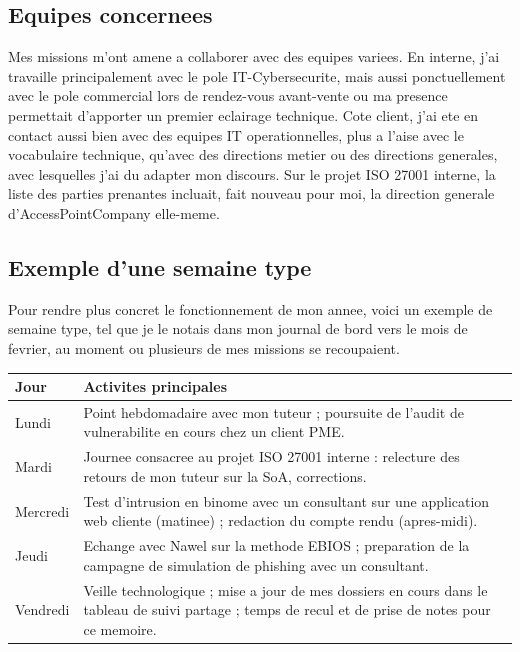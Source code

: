\documentclass[11pt,a4paper]{article}
\begin{document}
\subsection{Equipes concernees}

Mes missions m'ont amene a collaborer avec des equipes variees. En interne, j'ai travaille principalement avec le pole IT-Cybersecurite, mais aussi ponctuellement avec le pole commercial lors de rendez-vous avant-vente ou ma presence permettait d'apporter un premier eclairage technique. Cote client, j'ai ete en contact aussi bien avec des equipes IT operationnelles, plus a l'aise avec le vocabulaire technique, qu'avec des directions metier ou des directions generales, avec lesquelles j'ai du adapter mon discours. Sur le projet ISO 27001 interne, la liste des parties prenantes incluait, fait nouveau pour moi, la direction generale d'AccessPointCompany elle-meme.

\subsection{Exemple d'une semaine type}

Pour rendre plus concret le fonctionnement de mon annee, voici un exemple de semaine type, tel que je le notais dans mon journal de bord vers le mois de fevrier, au moment ou plusieurs de mes missions se recoupaient.

\begin{center}
\small
\begin{tabular}{@{}p{2.0cm}p{11.4cm}@{}}
\toprule
\textbf{Jour} & \textbf{Activites principales} \\
\midrule
Lundi & Point hebdomadaire avec mon tuteur ; poursuite de l'audit de vulnerabilite en cours chez un client PME. \\
Mardi & Journee consacree au projet ISO 27001 interne : relecture des retours de mon tuteur sur la SoA, corrections. \\
Mercredi & Test d'intrusion en binome avec un consultant sur une application web cliente (matinee) ; redaction du compte rendu (apres-midi). \\
Jeudi & Echange avec Nawel sur la methode EBIOS ; preparation de la campagne de simulation de phishing avec un consultant. \\
Vendredi & Veille technologique ; mise a jour de mes dossiers en cours dans le tableau de suivi partage ; temps de recul et de prise de notes pour ce memoire. \\
\bottomrule
\end{tabular}
\end{center}
\end{document}
